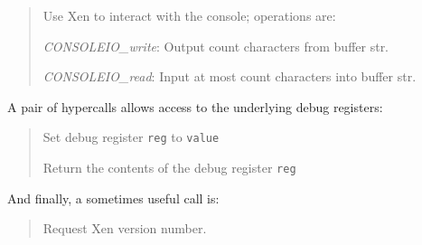 \documentclass[11pt,twoside,final,openright]{xenstyle}
\begin{document}
\begin{quote} 

Use Xen to interact with the console; operations are:

{\it CONSOLEIO\_write}: Output count characters from buffer str.

{\it CONSOLEIO\_read}: Input at most count characters into buffer str.
\end{quote} 

A pair of hypercalls allows access to the underlying debug registers: 
\begin{quote}

Set debug register {\tt reg} to {\tt value} 


Return the contents of the debug register {\tt reg}
\end{quote}

And finally, a sometimes useful call is: 
\begin{quote}

Request Xen version number.
\end{quote} 







\end{document}
